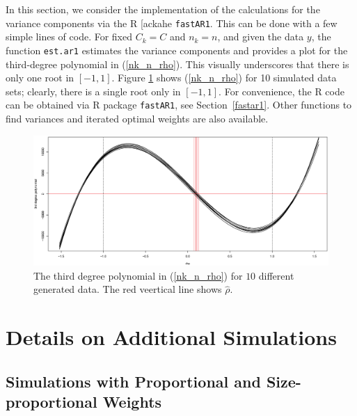 \documentclass[11pt,a5paper,twoside]{book}
\begin{document}
{In this section, we consider the implementation of the calculations for the variance components via the R [ackahe {\tt{fastAR1}}. This can be done with a few simple lines of code. For fixed $C_k=C$ and $n_k=n$, and given the data $y$, the function {\tt{est.ar1}} estimates the variance components and provides a plot for the third-degree polynomial in (\ref{nk_n_rho}). This visually underscores that there is only one root in $[-1,1]$. Figure \ref{3rd_poly} shows (\ref{nk_n_rho}) for 10 simulated data sets;  clearly, there is a single root only in $[-1,1]$. For convenience, the R code can be obtained via R package {\tt{fastAR1}}, see Section~\ref{fastar1}. Other functions to find variances and iterated optimal weights are also available.
\begin{figure}[t]
\centering
\includegraphics[width=\textwidth]{3rd_poly.eps}
\caption{The third degree polynomial in (\ref{nk_n_rho}) for $10$ different generated data. The red veertical line shows $\widehat{\rho}$.} \label{3rd_poly}
\end{figure}

\setcounter{equation}{0}
\section{Details on Additional Simulations\label{suppsimul}}

\subsection{Simulations with Proportional and Size-proportional Weights}

}
\end{document}
